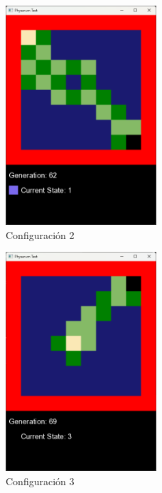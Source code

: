     \begin{figure}[htbp]
        \centering
        \includegraphics[width=0.5\textwidth]{./images/Pruebas/simulador/image004.png}
        \caption{Configuraci\'on 2}
        \label{fig:10x10}
    \end{figure}
    \vskip 0.5cm
    \begin{figure}[htbp]
        \centering
        \includegraphics[width=0.5\textwidth]{./images/Pruebas/simulador/image005.png}
        \caption{Configuraci\'on 3}
        \label{fig:Estados iniciales}
    \end{figure}
    \vskip 0.5cm
